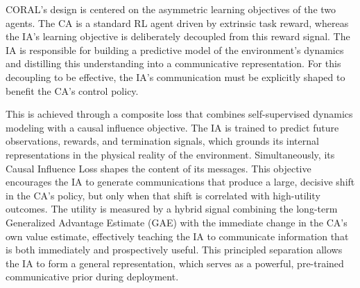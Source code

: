 \documentclass[letterpaper]{article} %
\begin{document}

CORAL's design is centered on the asymmetric learning objectives of the two agents. The CA is a standard RL agent driven by extrinsic task reward, whereas the IA's learning objective is deliberately decoupled from this reward signal. The IA is responsible for building a predictive model of the environment's dynamics and distilling this understanding into a communicative representation. For this decoupling to be effective, the IA's communication must be explicitly shaped to benefit the CA's control policy. 

This is achieved through a composite loss that combines self-supervised dynamics modeling with a causal influence objective. The IA is trained to predict future observations, rewards, and termination signals, which grounds its internal representations in the physical reality of the environment. Simultaneously, its Causal Influence Loss shapes the content of its messages. This objective encourages the IA to generate communications that produce a large, decisive shift in the CA's policy, but only when that shift is correlated with high-utility outcomes. The utility is measured by a hybrid signal combining the long-term Generalized Advantage Estimate (GAE) with the immediate change in the CA's own value estimate, effectively teaching the IA to communicate information that is both immediately and prospectively useful. This principled separation allows the IA to form a general representation, which serves as a powerful, pre-trained communicative prior during deployment.
\end{document}
